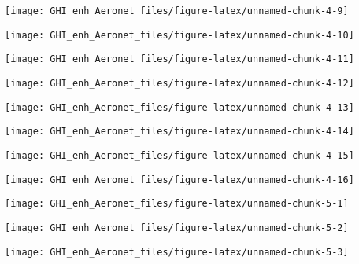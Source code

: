\documentclass[
  10pt,
  a4paper,oneside]{article}
\begin{document}
\begin{center}\texttt{[image: GHI\_enh\_Aeronet\_files/figure-latex/unnamed-chunk-4-9]} \end{center}

\begin{center}\texttt{[image: GHI\_enh\_Aeronet\_files/figure-latex/unnamed-chunk-4-10]} \end{center}

\begin{center}\texttt{[image: GHI\_enh\_Aeronet\_files/figure-latex/unnamed-chunk-4-11]} \end{center}

\begin{center}\texttt{[image: GHI\_enh\_Aeronet\_files/figure-latex/unnamed-chunk-4-12]} \end{center}

\begin{center}\texttt{[image: GHI\_enh\_Aeronet\_files/figure-latex/unnamed-chunk-4-13]} \end{center}

\begin{center}\texttt{[image: GHI\_enh\_Aeronet\_files/figure-latex/unnamed-chunk-4-14]} \end{center}

\begin{center}\texttt{[image: GHI\_enh\_Aeronet\_files/figure-latex/unnamed-chunk-4-15]} \end{center}

\begin{center}\texttt{[image: GHI\_enh\_Aeronet\_files/figure-latex/unnamed-chunk-4-16]} \end{center}

\begin{center}\texttt{[image: GHI\_enh\_Aeronet\_files/figure-latex/unnamed-chunk-5-1]} \end{center}

\begin{center}\texttt{[image: GHI\_enh\_Aeronet\_files/figure-latex/unnamed-chunk-5-2]} \end{center}

\begin{center}\texttt{[image: GHI\_enh\_Aeronet\_files/figure-latex/unnamed-chunk-5-3]} \end{center}
\end{document}
